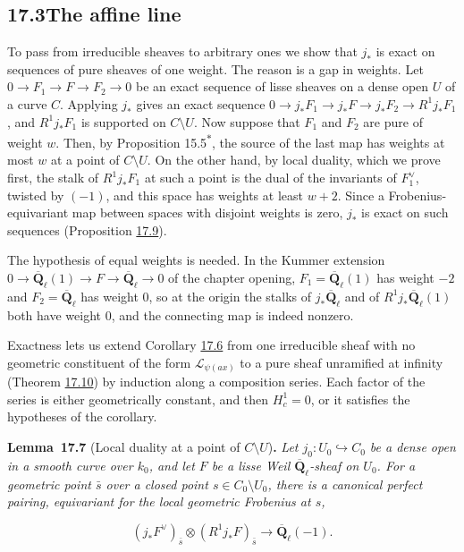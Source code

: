 \documentclass[11pt]{article}
\newenvironment{bpstatement}[2]{\par\addvspace{0.6\baselineskip}\noindent\textbf{#1}#2\textbf{.}\enspace\ignorespaces}
  {\par\addvspace{0.4\baselineskip}}
\newenvironment{bpstatementit}[2]{\begin{bpstatement}{#1}{#2}\itshape\ignorespaces}{\end{bpstatement}}
\newcommand{\bpout}[1]{#1\textsuperscript{\hyperlink{bp-outside}{\ensuremath{\ast}}}}
\begin{document}
\subsection*{\texorpdfstring{17.3\quad The affine line}{17.3 The affine line}}
\label{bp21}%
\label{bp22}%
To pass from irreducible sheaves to arbitrary ones we show that \(j_*\) is exact on sequences of pure sheaves of one weight. The reason is a gap in weights. Let \(0\to F_1\to F\to F_2\to0\) be an exact sequence of lisse sheaves on a dense open \(U\) of a curve \(C\). Applying \(j_*\) gives an exact sequence \(0\to j_*F_1\to j_*F\to j_*F_2\to R^1j_*F_1\), and \(R^1j_*F_1\) is supported on \(C\setminus U\). Now suppose that \(F_1\) and \(F_2\) are pure of weight \(w\). Then, by Proposition \bpout{15.5}, the source of the last map has weights at most \(w\) at a point of \(C\setminus U\). On the other hand, by local duality, which we prove first, the stalk of \(R^1j_*F_1\) at such a point is the dual of the invariants of \(F_1^\vee\), twisted by \((-1)\), and this space has weights at least \(w+2\). Since a Frobenius-equivariant map between spaces with disjoint weights is zero, \(j_*\) is exact on such sequences (Proposition \hyperref[bp27]{17.9}).

The hypothesis of equal weights is needed. In the Kummer extension \(0\to\overline{\mathbf Q}_\ell(1)\to F\to\overline{\mathbf Q}_\ell\to0\) of the chapter opening, \(F_1=\overline{\mathbf Q}_\ell(1)\) has weight \(-2\) and \(F_2=\overline{\mathbf Q}_\ell\) has weight \(0\), so at the origin the stalks of \(j_*\overline{\mathbf Q}_\ell\) and of \(R^1j_*\overline{\mathbf Q}_\ell(1)\) both have weight \(0\), and the connecting map is indeed nonzero.

Exactness lets us extend Corollary \hyperref[bp19]{17.6} from one irreducible sheaf with no geometric constituent of the form \(\mathcal L_{\psi(ax)}\) to a pure sheaf unramified at infinity (Theorem \hyperref[bp30]{17.10}) by induction along a composition series. Each factor of the series is either geometrically constant, and then \(H^1_c=0\), or it satisfies the hypotheses of the corollary.

\label{bp23}%
\begin{bpstatementit}{Lemma~17.7}{ (Local duality at a point of $C\setminus U$)}
Let \(j_0:U_0\hookrightarrow C_0\) be a dense open in a smooth curve over \(k_0\), and let \(F\) be a lisse Weil \(\overline{\mathbf Q}_\ell\)-sheaf on \(U_0\). For a geometric point \(\bar s\) over a closed point \(s\in C_0\setminus U_0\), there is a canonical perfect pairing, equivariant for the local geometric Frobenius at \(s\),

\[
(j_*F^\vee)_{\bar s}\otimes(R^1j_*F)_{\bar s}
\longrightarrow\overline{\mathbf Q}_\ell(-1).
\]
\end{bpstatementit}
\end{document}

